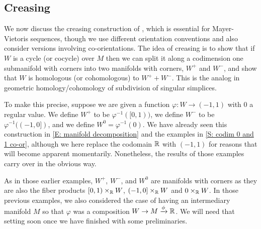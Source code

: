 \begin{comment}
	For the third product, we have by Joyce's convention that \red{I'm not getting a simple description of this because of Joyce's desription.
		Note that it requires using a specific identification of $TV \oplus TW$ with $TP \oplus TM$.
		I compute that even if we use identify $TM = \nu W \oplus TP \oplus \nu V$, $TV = \nu W \oplus TP$, and $TW = TP \oplus \nu V \oplus TP$ consistently, there's a sign of $(-1)^{m-w}$ from the determinant of Joyce's isomorphism, and then he enforces another factor of $(-1)^{mw}$ by hand.
		Yuck.
		And this is before comparing the actual orientations of things - yuck.
		We'll have to think some more about this.
	}.
\end{comment}

\subsection{Creasing}\label{S: creasing}

We now discuss the creasing construction of \cite[Section 2.4]{Lipy14}, which is essential for Mayer-Vietoris sequences, though we use different orientation conventions and also consider versions involving co-orientations.
The idea of creasing is to show that if $W$ is a cycle (or cocycle) over $M$ then we can split it along a codimension one submanifold with corners into two manifolds with corners, $W^+$ and $W^-$, and show that $W$ is homologous (or cohomologous) to $W^+ + W^-$.
This is the analog in geometric homology/cohomology of subdivision of singular simplices.

To make this precise, suppose we are given a function $\varphi \colon W \to (-1,1)$ with $0$ a regular value.
We define $W^+$ to be $\varphi^{-1}( [0,1))$, we define $W^-$ to be $\varphi^{-1} ((-1, 0])$, and we define $W^0 = \varphi^{-1}(0)$.
We have already seen this construction in \cref{E: manifold decomposition} and the examples in \cref{S: codim 0 and 1 co-or}, although we here replace the codomain $\mathbb{R}$ with $(-1,1)$ for reasons that will become apparent momentarily.
Nonetheless, the results of those examples carry over in the obvious way.

As in those earlier examples, $W^+$, $W^-$, and $W^0$
are manifolds with corners as they are also the fiber products $[0,1)\times_{\mathbb{R}} W$, $(-1,0] \times_{\mathbb{R}} W$ and $0 \times_{\mathbb{R}} W$.
In those previous examples, we also considered the case of having an intermediary manifold $M$ so that $\varphi$ was a composition $W \to M \xrightarrow{\phi} \mathbb{R}$.
We will need that setting soon once we have finished with some preliminaries.

